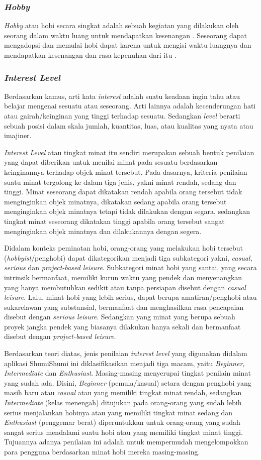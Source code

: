 \documentclass[a4paper]{article}
\newcommand{\subsubbab}[1]{%
    \subsubsection{#1}%
}
\begin{document}
\subsubbab{\textit{Hobby}}
\textit{Hobby} atau hobi secara singkat adalah sebuah kegiatan yang dilakukan oleh seorang dalam waktu luang untuk mendapatkan kesenangan \autocite{Dict_hobi}. Seseorang dapat mengadopsi dan memulai hobi dapat karena untuk mengisi waktu luangnya dan mendapatkan kesenangan dan rasa kepenuhan dari itu \autocite{linkedin_hobi}.

\subsubbab{\textit{Interest Level}}
Berdasarkan kamus, arti kata \textit{interest} adalah suatu keadaan ingin tahu atau belajar mengenai sesuatu atau seseorang\autocite{dictionary-interest}. Arti lainnya adalah kecenderungan hati atau gairah/keinginan yang tinggi terhadap sesuatu\autocite{arti-kata-minat}. Sedangkan \textit{level} berarti sebuah posisi dalam skala jumlah, kuantitas, luas, atau kualitas yang nyata atau imajiner\autocite{dictionary-level}. 

\textit{Interest Level} atau tingkat minat itu sendiri merupakan sebuah bentuk penilaian yang dapat diberikan untuk menilai minat pada sesuatu berdasarkan keinginannya terhadap objek minat tersebut. Pada dasarnya, kriteria penilaian suatu minat tergolong ke dalam tiga jenis, yakni minat rendah, sedang dan tinggi. Minat seseorang dapat dikatakan rendah apabila orang tersebut tidak menginginkan objek minatnya, dikatakan sedang apabila orang tersebut menginginkan objek minatnya tetapi tidak dilakukan dengan segara, sedangkan tingkat minat seseorang dikatakan tinggi apabila orang tersebut sangat menginginkan objek minatnya dan dilakukannya dengan segera\autocite{kriteria-minat}.

Didalam konteks peminatan hobi, orang-orang yang melakukan hobi tersebut (\textit{hobbyist}/penghobi) dapat dikategorikan menjadi tiga subkategori yakni, \textit{casual, serious} dan \textit{project-based leisure}. Subkategori minat hobi yang santai, yang secara intrinsik bermanfaat, memiliki kurun waktu yang pendek dan menyenangkan yang hanya membutuhkan sedikit atau tanpa persiapan disebut dengan \textit{casual leisure}. Lalu, minat hobi yang lebih serius, dapat berupa amatiran/penghobi atau sukarelawan yang substansial, bermanfaat dan menghasilkan rasa pencapaian disebut dengan \textit{serious leisure}. Sedangkan yang minat yang berupa sebuah proyek jangka pendek yang biasanya dilakukan hanya sekali dan bermanfaat disebut dengan \textit{project-based leisure}\autocite[1-5;17-21;33-34]{hobbyist-types}.

Berdasarkan teori diatas, jenis penilaian \textit{interest level} yang digunakan didalam aplikasi ShumiShumi ini diklasifikasikan menjadi tiga macam, yaitu \textit{Beginner, Intermediate} dan \textit{Enthusiast}. Masing-masing menyerupai tingkat penilain minat yang sudah ada. Disini, \textit{Beginner} (pemula/kasual) setara dengan penghobi yang masih baru atau \textit{casual} atau yang memiliki tingkat minat rendah, sedangkan \textit{Intermediate} (kelas menengah) ditujukan pada orang-orang yang sudah lebih serius menjalankan hobinya atau yang memiliki tingkat minat sedang dan \textit{Enthusiast} (penggemar berat) diperuntukkan untuk orang-orang yang sudah sangat serius mendalami suatu hobi atau yang memiliki tingkat minat tinggi. Tujuannya adanya penilaian ini adalah untuk mempermudah mengelompokkan para pengguna berdasarkan minat hobi mereka masing-masing.
\end{document}
